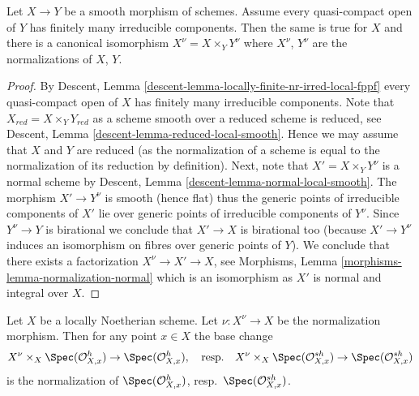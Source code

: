 \begin{lemma}
\label{lemma-normalization-and-smooth}
Let $X \to Y$ be a smooth morphism of schemes. Assume every quasi-compact
open of $Y$ has finitely many irreducible components. Then the same
is true for $X$ and there is a canonical isomorphism
$X^\nu = X \times_Y Y^\nu$ where $X^\nu$, $Y^\nu$ are the normalizations
of $X$, $Y$.
\end{lemma}

\begin{proof}
By Descent, Lemma \ref{descent-lemma-locally-finite-nr-irred-local-fppf}
every quasi-compact open of $X$ has finitely many irreducible components.
Note that $X_{red} = X \times_Y Y_{red}$ as a scheme smooth over a reduced
scheme is reduced, see
Descent, Lemma \ref{descent-lemma-reduced-local-smooth}.
Hence we may assume that $X$ and $Y$ are reduced (as the normalization
of a scheme is equal to the normalization of its reduction by
definition). Next, note that $X' = X \times_Y Y^\nu$ is a normal scheme
by Descent, Lemma \ref{descent-lemma-normal-local-smooth}.
The morphism $X' \to Y^\nu$ is smooth (hence flat) thus the generic
points of irreducible components of $X'$ lie over generic points of
irreducible components of $Y^\nu$. Since $Y^\nu \to Y$ is birational
we conclude that $X' \to X$ is birational too (because $X' \to Y^\nu$
induces an isomorphism on fibres over generic points of $Y$).
We conclude that there exists a factorization
$X^\nu \to X' \to X$, see
Morphisms, Lemma \ref{morphisms-lemma-normalization-normal}
which is an isomorphism as $X'$ is normal and integral over $X$.
\end{proof}

\begin{lemma}
\label{lemma-normalization-and-henselization}
Let $X$ be a locally Noetherian scheme. Let $\nu : X^\nu \to X$
be the normalization morphism. Then for any point $x \in X$
the base change
$$
X^\nu \times_X \Spec(\mathcal{O}_{X, x}^h) \to \Spec(\mathcal{O}_{X, x}^h),
\quad\text{resp.}\quad
X^\nu \times_X \Spec(\mathcal{O}_{X, x}^{sh}) \to \Spec(\mathcal{O}_{X, x}^{sh})
$$
is the normalization of $\Spec(\mathcal{O}_{X, x}^h)$,
resp.\ $\Spec(\mathcal{O}_{X, x}^{sh})$.
\end{lemma}

